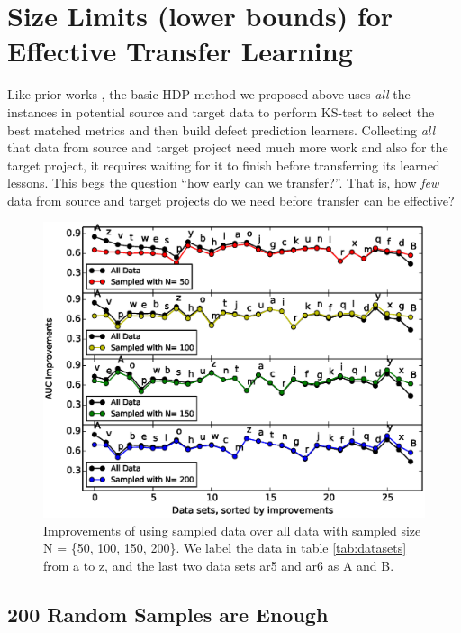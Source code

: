 
\section{Size Limits (lower bounds) for Effective Transfer Learning}
\label{sec:sizelimit}

Like prior works \cite{nam2013transfer,
  ma2012transfer, rahman2012recalling, ryu2014value,
  zhang2014towards}, the basic HDP method we
proposed above uses {\em all} the instances in potential source and target data to
perform KS-test to select the best matched metrics and then build
defect prediction learners.
Collecting {\em all} that data from source and target project need much more work and also
for the target project, it requires waiting for it to finish before
transferring its learned lessons. This begs the question ``how early can we transfer?''.
That is, how {\em few} data from source and target projects do we need before transfer can be effective?

\begin{figure}[t]
	\centering
	\includegraphics[width=\linewidth]{Figures/raleigh/sample_random.eps}
	\caption{Improvements of using sampled data over all data with sampled size N = \{50, 100, 150, 200\}. We label the data in table \ref{tab:datasets} from a to z, and the last two data sets ar5 and ar6 as A and B.}
	\label{fig:small_data}
\end{figure}


\subsection{200 Random Samples are Enough}

